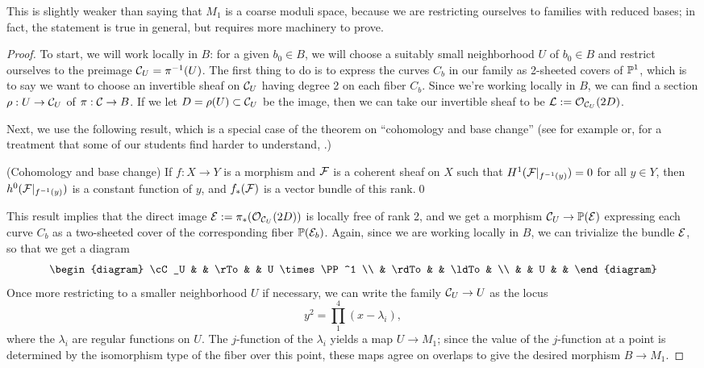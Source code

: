 This is slightly weaker than saying that $M_1$ is a coarse moduli space, because we are restricting ourselves to families with reduced bases; in fact, the statement is true in general, but requires more machinery to prove.



\begin{proof}
To start, we will work locally in $B$: for a given $b_0 \in B$, we will choose a suitably small neighborhood $U$ of $b_0 \in B$ and restrict ourselves to the preimage $\mathcal C_U = \pi^{-1}(U)$. The first thing to do is to express the curves $C_b$ in our family as 2-sheeted covers of ${\mathbb P}^1$, which is to say we want to choose an invertible sheaf on $\mathcal C_U$ having degree 2 on each fiber $C_b$. Since we're working locally in $B$,
we can find a section $\rho : U \to \mathcal C_U$ of $\pi : \mathcal C \to B$. If we let $D = \rho(U) \subset \mathcal C_U$ be the image, then we can take our invertible sheaf to be ${\mathcal L} := {\mathcal O}_{\mathcal C_U}(2D)$.

Next, we use the following result, which is a special case of the theorem on ``cohomology and base change''
(see for example \cite[Appendix, Theorems B.5 and B.9]{3264} or, for a treatment that some of our students find harder to understand, \cite[Theorem 12.11]{Hartshorne1977}.)
\begin{theorem}(Cohomology and base change) If $f: X\to Y$ is a morphism and ${\mathcal F}$ is
a coherent sheaf on $X$ such that $H^{1}({\mathcal F}|_{f^{-1}(y)})= 0$ for all $y\in Y$, then 
$h^{0}({\mathcal F}|_{f^{-1}(y)})$ is a constant function of $y$, and 
$f_{*}({\mathcal F})$ is a vector bundle of this rank.\qed
\end{theorem}

This result implies that the direct image $\mathcal E := \pi_*({\mathcal O}_{\mathcal C_U}(2D))$ is locally free of rank 2, and we get a morphism $\mathcal C_U \to {\mathbb P}(\mathcal E)$ expressing each curve $C_b$ as a two-sheeted cover of the corresponding fiber ${\mathbb P}(\mathcal E_b)$. Again, since we are working locally in $B$, we can trivialize the bundle $\mathcal E$, so that we get a diagram
$$
\begin{diagram}
\cC_U & & \rTo & & U \times \PP^1 \\
& \rdTo & & \ldTo & \\
& & U & &
\end{diagram} 
$$
Once more restricting to a smaller neighborhood $U$ if necessary, we can write the family $\mathcal C_U \to U$ as the locus
$$
y^2 = \prod_1^4 (x - \lambda_i),
$$
where the $\lambda_i$ are regular functions on $U$. The $j$-function of the $\lambda_i$  yields a map $U \to M_1$; since the value of the $j$-function at a point is determined by the isomorphism type of the fiber over this point, these maps agree on overlaps to give  the desired morphism $B \to M_1$.
\end{proof}



